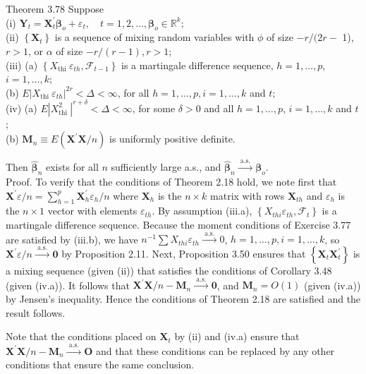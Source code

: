 \documentclass[10pt]{article}
\begin{document}
Theorem 3.78 Suppose\\
(i) $\mathbf{Y}_{t}=\mathbf{X}_{t}^{\prime} \boldsymbol{\beta}_{o}+\varepsilon_{t}, \quad t=1,2, \ldots, \boldsymbol{\beta}_{o} \in \mathbb{R}^{k} ;$\\
(ii) $\left\{\mathbf{X}_{t}\right\}$ is a sequence of mixing random variables with $\phi$ of size $-r /(2 r-$ 1), $r>1$, or $\alpha$ of size $-r /(r-1), r>1$;\\
(iii) (a) $\left\{X_{\text {thi }} \varepsilon_{t h}, \mathcal{F}_{t-1}\right\}$ is a martingale difference sequence, $h=1, \ldots, p$, $i=1, \ldots, k ;$\\
(b) $E\left|X_{\text {thi }} \varepsilon_{t h}\right|^{2 r}<\Delta<\infty$, for all $h=1, \ldots, p, i=1, \ldots, k$ and $t$;\\
(iv) (a) $E\left|X_{\text {thi }}^{2}\right|^{r+\delta}<\Delta<\infty$, for some $\delta>0$ and all $h=1, \ldots, p$, $i=1, \ldots, k$ and $t$;\\
(b) $\mathbf{M}_{n} \equiv E\left(\mathbf{X}^{\prime} \mathbf{X} / n\right)$ is uniformly positive definite.

Then $\hat{\boldsymbol{\beta}}_{n}$ exists for all $n$ sufficiently large a.s., and $\hat{\boldsymbol{\beta}}_{n} \xrightarrow{\text { a.s. }} \boldsymbol{\beta}_{o}$.\\
Proof. To verify that the conditions of Theorem 2.18 hold, we note first that $\mathbf{X}^{\prime} \varepsilon / n=\sum_{h=1}^{p} \mathbf{X}_{h}^{\prime} \varepsilon_{h} / n$ where $\mathbf{X}_{h}$ is the $n \times k$ matrix with rows $\mathbf{X}_{t h}$ and $\varepsilon_{h}$ is the $n \times 1$ vector with elements $\varepsilon_{t h}$. By assumption (iii.a), $\left\{X_{t h i} \varepsilon_{t h}, \mathcal{F}_{t}\right\}$ is a martingale difference sequence. Because the moment conditions of Exercise 3.77 are satisfied by (iii.b), we have $n^{-1} \sum X_{t h i} \varepsilon_{t h} \xrightarrow{\text { a.s. }} 0$, $h=1, \ldots, p, i=1, \ldots, k$, so $\mathbf{X}^{\prime} \varepsilon / n \xrightarrow{\text { a.s. }} \mathbf{0}$ by Proposition 2.11. Next, Proposition 3.50 ensures that $\left\{\mathbf{X}_{t} \mathbf{X}_{t}^{\prime}\right\}$ is a mixing sequence (given (ii)) that satisfies the conditions of Corollary 3.48 (given (iv.a)). It follows that $\mathbf{X}^{\prime} \mathbf{X} / n-\mathbf{M}_{n} \xrightarrow{\text { a.s. }} \mathbf{0}$, and $\mathbf{M}_{n}=O(1)$ (given (iv.a)) by Jensen's inequality. Hence the conditions of Theorem 2.18 are satisfied and the result follows.

Note that the conditions placed on $\mathbf{X}_{t}$ by (ii) and (iv.a) ensure that $\mathbf{X}^{\prime} \mathbf{X} / n-\mathbf{M}_{n} \xrightarrow{\text { a.s. }} \mathbf{O}$ and that these conditions can be replaced by any other conditions that ensure the same conclusion.
\end{document}
